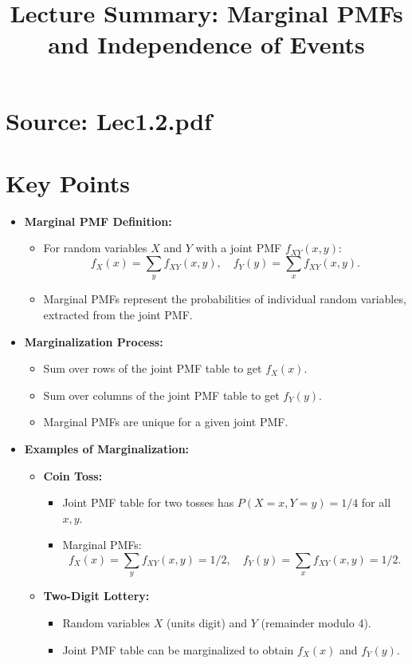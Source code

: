 \documentclass{article}
\title{Lecture Summary: Marginal PMFs and Independence of Events}
\author{}
\date{}
\begin{document}
\maketitle

\section*{Source: Lec1.2.pdf}

\section*{Key Points}

\begin{itemize}
  \item \textbf{Marginal PMF Definition:}
    \begin{itemize}
      \item For random variables $X$ and $Y$ with a joint PMF $f_{XY}(x, y)$:
        \[
          f_X(x) = \sum_{y} f_{XY}(x, y), \quad f_Y(y) = \sum_{x} f_{XY}(x, y).
        \]
      \item Marginal PMFs represent the probabilities of individual random variables, extracted from the joint PMF.
    \end{itemize}

  \item \textbf{Marginalization Process:}
    \begin{itemize}
      \item Sum over rows of the joint PMF table to get $f_X(x)$.
      \item Sum over columns of the joint PMF table to get $f_Y(y)$.
      \item Marginal PMFs are unique for a given joint PMF.
    \end{itemize}

  \item \textbf{Examples of Marginalization:}
    \begin{itemize}
      \item \textbf{Coin Toss:}
        \begin{itemize}
          \item Joint PMF table for two tosses has $P(X = x, Y = y) = 1/4$ for all $x, y$.
          \item Marginal PMFs:
            \[
              f_X(x) = \sum_{y} f_{XY}(x, y) = 1/2, \quad f_Y(y) = \sum_{x} f_{XY}(x, y) = 1/2.
            \]
        \end{itemize}
      \item \textbf{Two-Digit Lottery:}
        \begin{itemize}
          \item Random variables $X$ (units digit) and $Y$ (remainder modulo 4).
          \item Joint PMF table can be marginalized to obtain $f_X(x)$ and $f_Y(y)$.
        \end{itemize}
    \end{itemize}


\end{itemize}
\end{document}
